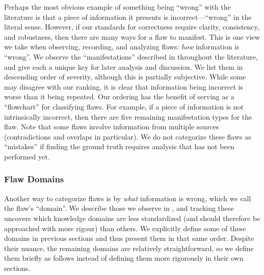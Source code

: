 Perhaps the most obvious example of something being ``wrong'' with the
literature is that a piece of information it presents is incorrect---``wrong''
in the literal sense. However, if our standards for correctness require
clarity, consistency, and robustness, then there are many ways for a flaw to
manifest. This is one view we take when observing, recording, and analyzing
flaws: \emph{how} information is ``wrong''. We observe the
``manifestations'' described in  throughout the
literature, and give each a unique key for later analysis and discussion. We
list them in descending order of severity, although this is partially
subjective. While some may disagree with our ranking, it is clear that
information being incorrect is worse than it being repeated. Our ordering has
the benefit of serving as a ``flowchart'' for classifying flaws. For example,
if a piece of information is not intrinsically incorrect, then there are five
remaining manifestation types for the flaw. Note that some flaws involve
information from multiple sources (contradictions and overlaps in particular).
We do not categorize these flaws as ``mistakes'' if finding the ground truth
requires analysis that has not been performed yet.



\ifnotpaper \newpage \fi

\subsubsection{Flaw Domains}\label{dmn-def}

Another way to categorize flaws is by \emph{what} information is wrong, which
we call the flaw's ``domain''. We describe those we observe in
, and tracking these uncovers which knowledge domains
are less standardized (and should therefore be approached with more rigour)
than others. We explicitly define some of these domains in previous
sections and thus present them in that same order. Despite their nuance, the
remaining domains are relatively straightforward, so we define them briefly as
follows instead of defining them more rigorously in their own sections.



